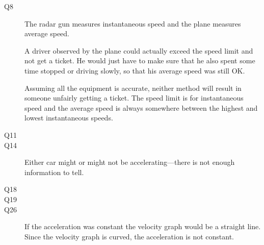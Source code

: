 \documentclass{exam}
\begin{document}
\begin{description}

\item[Q8]
The radar gun measures instantaneous speed and the plane measures average speed.

A driver observed by the plane could actually exceed the speed limit and not get a ticket.  He would just have to make
sure that he also spent some time stopped or driving slowly, so that his average speed was still OK.

Assuming all the equipment is accurate, neither method will result in someone unfairly getting a ticket.  The speed
limit is for instantaneous speed and the average speed is always somewhere between the highest and lowest instantaneous
speeds.

\item[Q11]

\item[Q14]
Either car might or might not be accelerating---there is not enough information to tell.

\item[Q18]

\item[Q19]

\item[Q26]
If the acceleration was constant the velocity graph would be a straight line.  Since the velocity graph is curved, the
acceleration is not constant.


\end{description}
\end{document}
